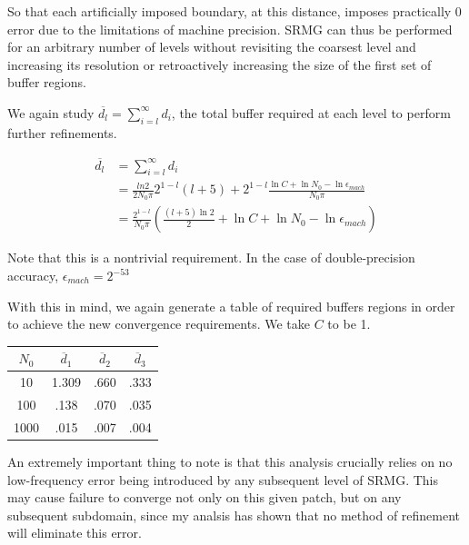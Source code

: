 \documentclass[final]{siamart1116}
\numberwithin{theorem}{section}
\begin{document}
So that each artificially imposed boundary, at this distance, imposes practically 0 error due to the limitations of machine precision. SRMG can thus be performed for an arbitrary number of levels without revisiting the coarsest level and increasing its resolution or retroactively increasing the size of the first set of buffer regions. 

We again study $\overline{d_l} = \sum_{i=l}^\infty d_i$, the total buffer required at each level to perform further refinements.


\begin{align*}
\overline{d_l} &= \sum_{i=l}^\infty d_i \\ 
& = \frac{ln2}{2 N_0 \pi } 2^{1-l}(l+5) + 2^{1-l}\frac{\ln{C} + \ln{N_0} -\ln{\epsilon_{mach}} }{ N_0 \pi}\\
& = \frac{2^{1-l}}{N_0 \pi } \left( \frac{(l+5)\ln2 }{2} + \ln C + \ln{N_0} - \ln{\epsilon_{mach}} \right)
\end{align*}



Note that this is a nontrivial requirement. In the case of double-precision accuracy, $\epsilon_{mach} = 2^{-53}$

With this in mind, we again generate a table of required buffers regions in order to achieve the new convergence requirements. We take $C$ to be 1. 

\begin{center}
\begin{tabular}{c | c |  c | c}
$N_0$  & $\overline d_1$ & $\overline d_2$ & $\overline d_3$\\
\hline
10 &  1.309 & .660 & .333\\ 
\hline
100 & .138 & .070 & .035 \\
\hline
1000 & .015   &  .007 & .004\\
\hline
\end{tabular}
\end{center}


An extremely important thing to note is that this analysis crucially relies on no low-frequency error being introduced by any subsequent level of SRMG. This may cause failure to converge not only on this given patch, but on any subsequent subdomain, since my analsis has shown that no method of refinement will eliminate this error. 
\end{document}
